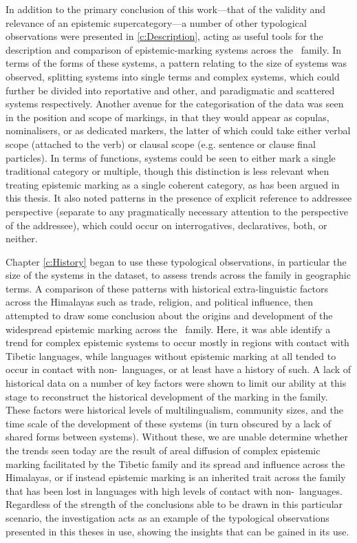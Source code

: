 In addition to the primary conclusion of this work---that of the validity and relevance of an epistemic supercategory---a number of other typological observations were presented in \cref{c:Description}, acting as useful tools for the description and comparison of epistemic-marking systems across the \lfam\ family. In terms of the forms of these systems, a pattern relating to the size of systems was observed, splitting systems into single terms and complex systems, which could further be divided into reportative and other, and paradigmatic and scattered systems respectively. Another avenue for the categorisation of the data was seen in the position and scope of markings, in that they would appear as copulas, nominalisers, or as dedicated markers, the latter of which could take either verbal scope (attached to the verb) or clausal scope (e.g. sentence or clause final particles). In terms of functions, systems could be seen to either mark a single traditional category or multiple, though this distinction is less relevant when treating epistemic marking as a single coherent category, as has been argued in this thesis. It also noted patterns in the presence of explicit reference to addressee perspective (separate to any pragmatically necessary attention to the perspective of the addressee), which could occur on interrogatives, declaratives, both, or neither. 

Chapter \ref{c:History} began to use these typological observations, in particular the size of the systems in the dataset, to assess trends across the family in geographic terms. A comparison of these patterns with historical extra-linguistic factors across the Himalayas such as trade, religion, and political influence, then attempted to draw some conclusion about the origins and development of the widespread epistemic marking across the \lfam\ family. Here, it was able identify a trend for complex epistemic systems to occur mostly in regions with contact with Tibetic languages, while languages without epistemic marking at all tended to occur in contact with non-\lfam\ languages, or at least have a history of such. A lack of historical data on a number of key factors were shown to limit our ability at this stage to reconstruct the historical development of the marking in the family. These factors were historical levels of multilingualism, community sizes, and the time scale of the development of these systems (in turn obscured by a lack of shared forms between systems). Without these, we are unable determine whether the trends seen today are the result of areal diffusion of complex epistemic marking facilitated by the Tibetic family and its spread and influence across the Himalayas, or if instead epistemic marking is an inherited trait across the family that has been lost in languages with high levels of contact with non-\lfam\ languages. Regardless of the strength of the conclusions able to be drawn in this particular scenario, the investigation acts as an example of the typological observations presented in this theses in use, showing the insights that can be gained in its use.

